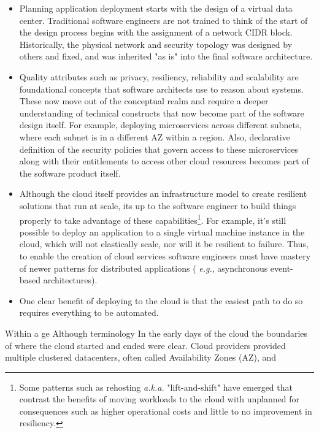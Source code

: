 \documentclass[conference]{IEEEconf}
\begin{document}
\begin{itemize}
	\item Planning application deployment starts with the design of a virtual data center. Traditional software engineers are not trained to think of the start of the design process begins with the assignment of a network CIDR block. Historically, the physical network and security topology was designed by others and fixed, and was inherited "as is" into the final software architecture. 
	
	\item Quality attributes such as privacy, resiliency, reliability and scalability are foundational concepts that software architects use to reason about systems.  These now move out of the conceptual realm and require a deeper understanding of technical constructs that now become part of the software design itself.  For example, deploying microservices across different subnets, where each subnet is in a different AZ within a region. Also, declarative definition of  the security policies that govern access to these microservices along with their entitlements to access other cloud resources becomes part of the software product itself. 
	
	\item Although the cloud itself provides an infrastructure model to create resilient solutions that run at scale, its up to the software engineer to build things properly to take advantage of these capabilities\footnote{Some patterns such as rehosting\cite{engelsrud2019moving} {\em a.k.a.} "lift-and-shift" have emerged that contrast the benefits of moving workloads to the cloud with unplanned for consequences such as higher operational costs and little to no improvement in resiliency.}.  For example, it's still possible to deploy an application to a single virtual machine instance in the cloud, which will not elastically scale, nor will it be resilient to failure.  Thus, to enable the creation of cloud services software engineers must have mastery of newer patterns for distributed applications ( {\em e.g.}, asynchronous event-based architectures).
	
	\item One clear benefit of deploying to the cloud is that the easiest path to do so requires everything to be automated. 
	
\end{itemize}


Within a ge
Although terminology In the early days of the cloud the boundaries of where the cloud started and ended were clear. Cloud providers provided multiple clustered datacenters, often called Availability Zones (AZ), and  
\end{document}
